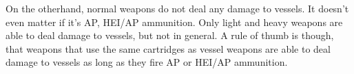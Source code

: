 On the otherhand, normal weapons do not deal any damage to vessels. It doesn't even matter if it's AP, HEI/AP ammunition. Only light and heavy weapons are able to deal damage to vessels, but not in general. A rule of thumb is though, that weapons that use the same cartridges as vessel weapons are able to deal damage to vessels as long as they fire AP or HEI/AP ammunition.


